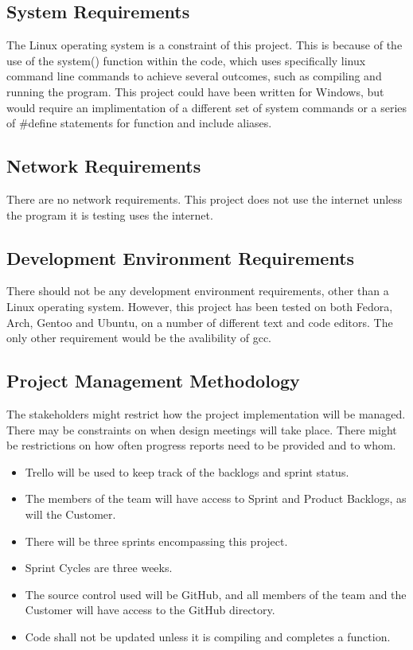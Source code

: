\subsection{System  Requirements}
The Linux operating system is a constraint of this project. This is because of the use of the system() function within the code, which uses specifically linux command line commands to achieve several outcomes, such as compiling and running the program. This project could have been written for Windows, but would require an implimentation of a different set of system commands or a series of \#define statements for function and include aliases.


\subsection{Network Requirements}
There are no network requirements. This project does not use the internet unless the program it is testing uses the internet.


\subsection{Development Environment Requirements}
There should not be any development environment requirements, other than a Linux operating system. However, this project has been tested on both Fedora, Arch, Gentoo and Ubuntu, on a number of different text and code editors. The only other requirement would be the avalibility of gcc.


\subsection{Project  Management Methodology}
The stakeholders might restrict how the project implementation will be managed.  There may be constraints on when design meetings will take place.  There might be restrictions on how often progress reports need to be provided and to whom. 
 
\begin{itemize}
\item Trello will be used to keep track of the backlogs and sprint status.
\item The members of the team will have access to Sprint and Product Backlogs, as will the Customer.
\item There will be three sprints encompassing this project.
\item Sprint Cycles are three weeks.
\item The source control used will be GitHub, and all members of the team and the Customer will have
 access to the GitHub directory.
\item Code shall not be updated unless it is compiling and completes a function.
\end{itemize}


